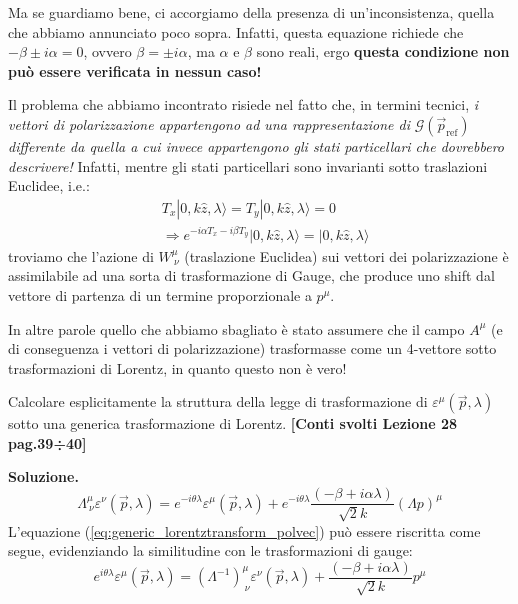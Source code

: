 \documentclass[../main.tex]{subfiles}
\begin{document}
\begin{enumerate}
    Ma se guardiamo bene, ci accorgiamo della presenza di un'inconsistenza, quella che abbiamo annunciato poco sopra. Infatti, questa equazione richiede che $-\beta\pm i\alpha =0$, ovvero $\beta = \pm i\alpha$, ma $\alpha$ e $\beta$ sono reali, ergo \textbf{questa condizione non può essere verificata in nessun caso!}
\end{enumerate}

Il problema che abbiamo incontrato risiede nel fatto che, in termini tecnici,\textit{ i vettori di polarizzazione appartengono ad una rappresentazione di }$\mathscr G(\Vec p_\text{ref})$ \textit{differente da quella a cui invece appartengono gli stati particellari che dovrebbero descrivere!} Infatti, mentre gli stati particellari sono invarianti sotto traslazioni Euclidee, i.e.:
\begin{align*}
    &T_x|0, k\hat{z}, \lambda\rangle = T_y|0, k\hat{z}, \lambda\rangle = 0 \\
    &\Rightarrow e^{-i\alpha T_x -i\beta T_y}|0, k\hat{z}, \lambda\rangle = |0, k\hat{z}, \lambda\rangle
\end{align*}
troviamo che l'azione di $W^{\mu}_{~\nu}$ (traslazione Euclidea) sui vettori dei polarizzazione è assimilabile ad una sorta di trasformazione di Gauge, che produce uno shift dal vettore di partenza di un termine proporzionale a $p^\mu$.

In altre parole quello che abbiamo sbagliato è stato assumere che il campo $A^\mu$ (e di conseguenza i vettori di polarizzazione) trasformasse come un 4-vettore sotto trasformazioni di Lorentz, in quanto questo non è vero!

\begin{exercise}
    Calcolare esplicitamente la struttura della legge di trasformazione di $\varepsilon^\mu(\Vec{p}, \lambda)$ sotto una generica trasformazione di Lorentz. \textbf{[Conti svolti Lezione 28 pag.39÷40]}

    \textbf{Soluzione. } 
    \begin{equation}
        \boxed{\Lambda^\mu_{~\nu}\varepsilon^\nu(\Vec{p}, \lambda) = e^{-i\theta\lambda}\varepsilon^\mu(\Vec{p}, \lambda) + e^{-i\theta\lambda}\frac{(-\beta+i\alpha\lambda)}{\sqrt{2}k}(\Lambda p)^\mu}
        \label{eq:generic_lorentztransform_polvec}
    \end{equation}
    L'equazione (\ref{eq:generic_lorentztransform_polvec}) può essere riscritta come segue, evidenziando la similitudine con le trasformazioni di gauge:
    \begin{equation}
        \boxed{e^{i\theta\lambda}\varepsilon^\mu(\Vec{p}, \lambda) = (\Lambda^{-1})^\mu_{~\nu}\varepsilon^\nu(\Vec{p}, \lambda) +\frac{(-\beta+i\alpha\lambda)}{\sqrt{2}k} p^\mu}
        \label{eq:generic_lorentztransform_polvec_inv}
    \end{equation}
\end{exercise}
\end{document}
